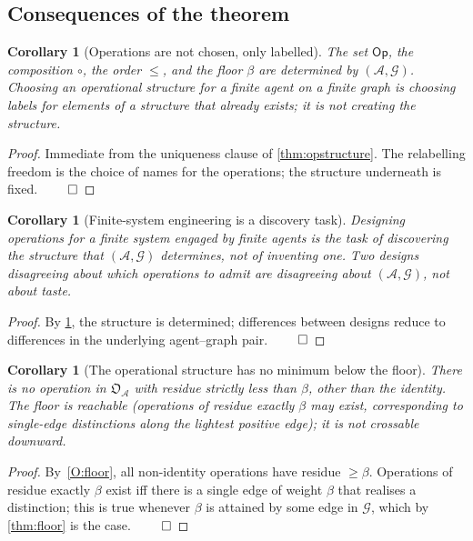 \documentclass[11pt,a4paper]{article}
\theoremstyle{thmstyle}
\newtheorem{corollary}[theorem]{Corollary}
\theoremstyle{definition}
\theoremstyle{remark}
\newcommand{\Graph}{\mathcal{G}}
\newcommand{\Agent}{\mathcal{A}}
\newcommand{\Op}{\mathsf{Op}}
\newcommand{\floor}{\beta}
\newcommand{\OpStr}{\mathfrak{O}}
\begin{document}
\subsection{Consequences of the theorem}

\begin{corollary}[Operations are not chosen, only labelled]
\label{cor:not_chosen}
The set $\Op$, the composition $\circ$, the order $\leq$, and the
floor $\floor$ are determined by $(\Agent, \Graph)$. Choosing an
operational structure for a finite agent on a finite graph is
choosing labels for elements of a structure that already exists; it
is not creating the structure.
\end{corollary}

\begin{proof}
Immediate from the uniqueness clause of \cref{thm:opstructure}.
The relabelling freedom is the choice of names for the operations;
the structure underneath is fixed. $\qed$
\end{proof}

\begin{corollary}[Finite-system engineering is a discovery task]
\label{cor:discovery}
Designing operations for a finite system engaged by finite agents
is the task of discovering the structure that $(\Agent, \Graph)$
determines, not of inventing one. Two designs disagreeing about
which operations to admit are disagreeing about $(\Agent, \Graph)$,
not about taste.
\end{corollary}

\begin{proof}
By \cref{cor:not_chosen}, the structure is determined; differences
between designs reduce to differences in the underlying agent--graph
pair. $\qed$
\end{proof}

\begin{corollary}[The operational structure has no minimum below the
floor]
\label{cor:no_below}
There is no operation in $\OpStr_\Agent$ with residue strictly less
than $\floor$, other than the identity. The floor is reachable
(operations of residue exactly $\floor$ may exist, corresponding to
single-edge distinctions along the lightest positive edge); it is
not crossable downward.
\end{corollary}

\begin{proof}
By~\ref{O:floor}, all non-identity operations have residue
$\geq \floor$. Operations of residue exactly $\floor$ exist iff
there is a single edge of weight $\floor$ that realises a
distinction; this is true whenever $\floor$ is attained by some
edge in $\Graph$, which by \cref{thm:floor} is the case. $\qed$
\end{proof}
\end{document}
